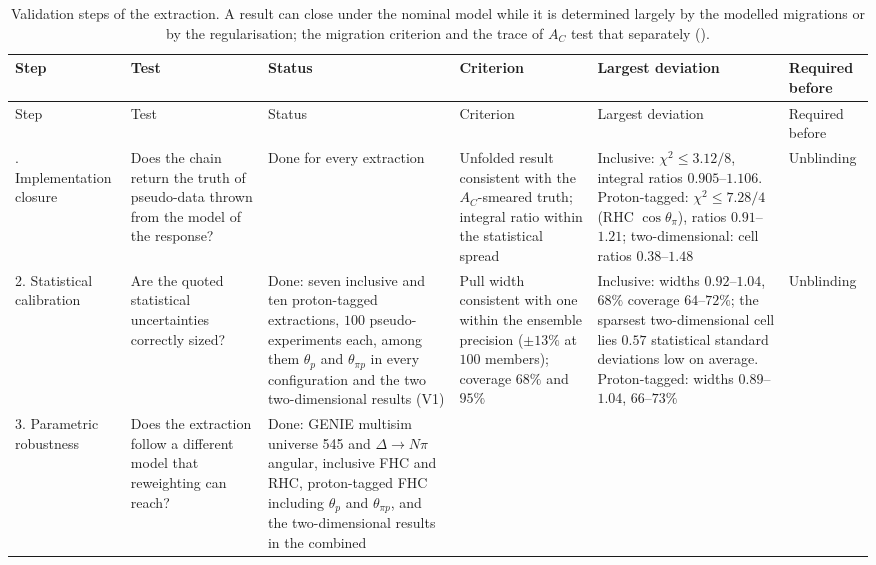 {\footnotesize\setlength{\tabcolsep}{4pt}
\begin{longtable}{@{}p{1.9cm}p{2.7cm}p{2.6cm}p{2.7cm}p{2.9cm}p{1.6cm}@{}}
\caption{Validation steps of the extraction. A result can close under the nominal model while it is
  determined largely by the modelled migrations or by the regularisation; the migration criterion and the
  trace of $A_C$ test that separately ().}
\label{tab:validation_ladder}\\
\toprule
Step & Test & Status & Criterion & Largest deviation & Required before \\
\midrule
\endfirsthead
\toprule
Step & Test & Status & Criterion & Largest deviation & Required before \\
\midrule
\endhead
\bottomrule
\endfoot
1. Implementation closure & Does the chain return the truth of pseudo-data thrown from the model of the
  response? & Done for every extraction &
  Unfolded result consistent with the $A_C$-smeared truth; integral ratio within the statistical spread &
  Inclusive: $\chi^2\le3.12/8$, integral ratios $0.905$--$1.106$. Proton-tagged: $\chi^2\le7.28/4$ (RHC
  $\cos\theta_\pi$), ratios $0.91$--$1.21$; two-dimensional: cell ratios $0.38$--$1.48$ & Unblinding \\
2. Statistical calibration & Are the quoted statistical uncertainties correctly sized? &
  Done: seven inclusive and ten proton-tagged extractions, $100$ pseudo-experiments each, among them
  $\theta_p$ and $\theta_{\pi p}$ in every configuration and the two two-dimensional results (V1) &
  Pull width consistent with one within the ensemble precision ($\pm13\%$ at $100$ members); coverage
  $68\%$ and $95\%$ &
  Inclusive: widths $0.92$--$1.04$, $68\%$ coverage $64$--$72\%$; the sparsest two-dimensional cell
  lies $0.57$ statistical standard deviations low on average. Proton-tagged: widths $0.89$--$1.04$,
  $66$--$73\%$ & Unblinding \\
3. Parametric robustness & Does the extraction follow a different model that reweighting can reach? &
  Done: GENIE multisim universe 545 and $\Delta\to N\pi$ angular, inclusive FHC and RHC, proton-tagged FHC
  including $\theta_p$ and $\theta_{\pi p}$, and the two-dimensional results in the combined

\end{longtable}}
